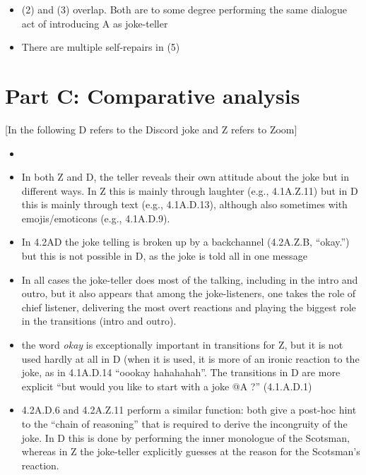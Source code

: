 \documentclass[a4]{scrartcl}
\begin{document}
\begin{itemize}
  \item (2) and (3) overlap. Both are to some degree performing the same dialogue act of introducing A as joke-teller
  \item There are multiple self-repairs in (5)
\end{itemize}

\section{Part C: Comparative analysis}

[In the following D refers to the Discord joke and Z refers to Zoom]

\begin{itemize}
  \item 
\end{itemize}

\begin{itemize}
  \item In both Z and D, the teller reveals their own attitude about the joke but in different ways. In Z this is mainly through laughter
    (e.g., 4.1A.Z.11) but in D this is mainly through text (e.g., 4.1A.D.13), although also sometimes with emojis/emoticons (e.g., 4.1A.D.9).
  \item In 4.2AD the joke telling is broken up by a backchannel (4.2A.Z.B, ``okay.'') but this is not possible in D, as the joke is told all in one message
  \item In all cases the joke-teller does most of the talking, including in the intro and outro, but it also appears that among the joke-listeners, one takes the role of chief listener, delivering the most overt reactions and playing the biggest role in the transitions (intro and outro).
  \item the word \emph{okay} is exceptionally important in transitions for Z, but it is not used hardly at all in D (when it is used, it is more
        of an ironic reaction to the joke, as in 4.1A.D.14 ``oookay hahahahah''. The transitions in D are more explicit ``but would you like to start with a joke @A ?'' (4.1.A.D.1)
  \item 4.2A.D.6 and 4.2A.Z.11 perform a similar function: both give a post-hoc hint to the ``chain of reasoning'' that is required to derive
    the incongruity of the joke. In D this is done by performing the inner monologue of the Scotsman, whereas in Z the joke-teller
    explicitly guesses at the reason for the Scotsman's reaction.
\end{itemize}
\end{document}
